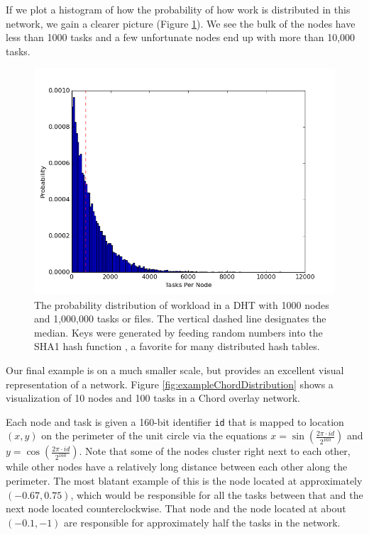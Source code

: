 \documentclass[11pt,letterpaper]{article}
\begin{document}
If we plot a histogram of how the probability of how work is distributed in this network, we gain a clearer picture (Figure \ref{fig:workloadDistribution}).
We see the bulk of the nodes have less than 1000 tasks and a few unfortunate nodes end up with more than 10,000 tasks.


\begin{figure}
	\centering
	\includegraphics[width=0.7\linewidth]{figs/workloadDistribution}
	\caption[Workload Distribution in a DHT]{The probability distribution of workload in a DHT with 1000 nodes and 1,000,000 tasks or files.  The vertical dashed line designates the median.  Keys were generated by feeding random numbers into the SHA1 hash function \cite{sha1}, a favorite for many distributed hash tables.}
	\label{fig:workloadDistribution}
\end{figure}

Our final example is on a much smaller scale, but provides an excellent visual representation of a network.
Figure \ref{fig:exampleChordDistribution} shows a visualization of 10 nodes and 100 tasks in a Chord overlay network.

Each node and task is given a 160-bit identifier \texttt{id} that is mapped to location $ (x,y) $ on the perimeter of the unit circle via the equations $ x = \sin\left( \frac{ 2 \pi \cdot id}{2^{160}} \right)$ and $ y = \cos\left( \frac{ 2 \pi \cdot id}{2^{160}} \right)$. 
Note that some of the nodes cluster right next to each other, while other nodes have a relatively long distance between each other along the perimeter.  
The most blatant example of this is the node located at approximately $(-0.67, 0.75)$, which would be responsible for all the tasks between that and the next node located counterclockwise.
That node and the node located at about $(-0.1, -1)$ are responsible for approximately half the tasks in the network.
\end{document}
